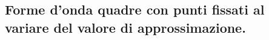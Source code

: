 \documentclass[10pt,a4paper]{article}
\begin{document}
\subsection{Forme d'onda quadre con punti fissati al variare del valore di approssimazione.}
\begin{figure}[H]
    \centering
    \vspace{-0.3cm}
    \vspace{-0.3cm}
\end{figure}
\end{document}
